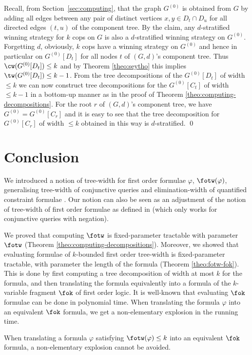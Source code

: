 \documentclass{LMCS}
\renewcommand{\phi}{\varphi}
\begin{document}
Recall, from Section~\ref{sec:computing}, 
that the graph $G^{(0)}$ is obtained from $G$ 
by adding all edges between any pair of distinct vertices $x,y\in D_t\cap D_u$ 
for all directed edges $(t,u)$ of the component tree. 
By the claim, any $d$-stratified winning strategy for $k$ cops on $G$ is 
also a $d$-stratified winning strategy on $G^{(0)}$. 
Forgetting $d$, obviously, $k$ cops have a winning strategy on $G^{(0)}$ 
and hence in particular on $G^{(0)}[D_t]$ 
for all nodes $t$ of $(G,d)$'s component tree. 
Thus $\cw(G^{(0)}[D_t])\leq k$ 
and by Theorem \ref{theo:seytho} this implies $\tw(G^{(0)}[D_t])\leq k-1$. 
{}From the tree decompositions of the $G^{(0)}[D_t]$ of width $\leq k$ 
we can now construct tree decompositions for the $G^{(0)}[C_t]$ 
of width $\leq k-1$ in a bottom-up manner 
as in the proof of Theorem \ref{theo:computing-decompositions}. 
For the root $r$ of $(G,d)$'s component tree, 
we have $G^{(0)}=G^{(0)}[C_r]$ and it is easy to see 
that the tree decomposition for $G^{(0)}[C_r]$ of width $\leq k$ 
obtained in this way is $d$-stratified. 
\qed


\section{Conclusion}\label{section:conclusion}

We introduced a notion of tree-width for first order formulae $\phi$,
$\fotw(\phi)$,
generalising tree-width of conjunctive queries and
elimination-width of quantified constraint formulae \cite{chedal05}.
Our notion can also be seen as an adjustment of the notion of tree-width of first order
formulae as defined in \cite{flufrigro01} (which only works for conjunctive
queries with negation).

We proved that computing $\fotw$ 
is fixed-parameter tractable with parameter $\fotw$
(Theorem \ref{theo:computing-decompositions}).
Moreover, we showed that evaluating formulae of $k$-bounded
first order tree-width is fixed-parameter tractable, with
parameter the length of the formula (Theorem \ref{theo:fotw-fok}). 
This is done by first computing a tree decomposition of width at most $k$
for the formula, and then translating
the formula equivalently into a formula of the $k$-variable
fragment $\fok$ of first order logic. It is well-known that
evaluating $\fok$ formulae can be done in polynomial time.
When translating the formula $\phi$ into an equivalent $\fok$
formula, we get a non-elementary explosion in the running time. 

\begin{conj}
When translating a formula $\phi$ satisfying $\fotw(\phi)\leq k$ 
into an equivalent $\fok$
formula, a non-elementary explosion cannot be avoided.
\end{conj}
\end{document}
